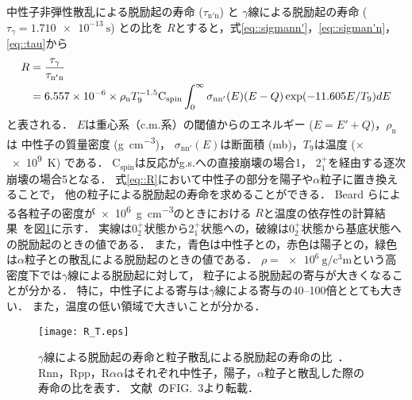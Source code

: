 \documentclass[../master]{subfiles}
\begin{document}
中性子非弾性散乱による脱励起の寿命 ($\tau_{\mathrm{n'n}}$) と
$\gamma$線による脱励起の寿命 ($\tau_{\gamma} = \SI{1.710e-13}{\second}$) との比を
$R$とすると，式\eqref{eq::sigmann'}，\eqref{eq::sigman'n}，\eqref{eq::tau}から
\begin{align}
  R &= \frac{\tau_{\gamma}}{\tau_{\mathrm{n'n}}} \notag\\
  &= 6.557\times10^{-6}\times\rho_{\mathrm{n}}T_{9}^{-1.5}\mathrm{C}_{{\text{spin}}}
  \int^{\infty}_{0}\sigma_{\mathrm{nn}'}(E)(E-Q)\exp(-11.605E/T_{9})dE
  \label{eq::R}
\end{align}
と表される．
$E$は重心系（c.m.系）の閾値からのエネルギー ($E=E'+Q$)，$\rho_{\mathrm{n}}$は
中性子の質量密度 (\si{\gram\per\cubic\centi\metre})，
$\sigma_{\mathrm{nn}'}(E)$は断面積 (\si{\milli\barn})，$T_{9}$は温度 ($\times$\SI{e9}{\kelvin}) である．
$\mathrm{C}_{{\text{spin}}}$は反応がg.s.への直接崩壊の場合1，
$2_{1}^{+}$を経由する逐次崩壊の場合5となる．
式\eqref{eq::R}において中性子の部分を陽子や$\alpha$粒子に置き換えることで，
他の粒子による脱励起の寿命を求めることができる．
Beard らによる各粒子の密度が\SI{e6}{\gram\per\cubic\centi\metre}のときにおける
$R$と温度の依存性の計算結果~\cite{hotdensemedium}を図\ref{fig::R}に示す．
実線は$0_2^+$状態から$2_1^+$状態への，破線は$0_2^+$状態から基底状態への脱励起のときの値である．
また，青色は中性子との，赤色は陽子との，緑色は$\alpha$粒子との散乱による脱励起のときの値である．
$\rho = \SI{e6}{\gram\per\cubic\centi\metre}$という高密度下では$\gamma$線による脱励起に対して，
粒子による脱励起の寄与が大きくなることが分かる．
特に，中性子による寄与は$\gamma$線による寄与の40--100倍ととても大きい．
また，温度の低い領域で大きいことが分かる．
\begin{figure}
  \centering
  \texttt{[image: R\_T.eps]}
  \caption[$\gamma$線による脱励起の寿命と粒子散乱による脱励起の寿命の比．]
          {$\gamma$線による脱励起の寿命と粒子散乱による脱励起の寿命の比~\cite{hotdensemedium}．
            Rnn，Rpp，R$\alpha\alpha$はそれぞれ中性子，陽子，$\alpha$粒子と散乱した際の寿命の比を表す．
          文献~\cite{hotdensemedium}のFIG.~3より転載．}
  \label{fig::R}
\end{figure}
\end{document}
